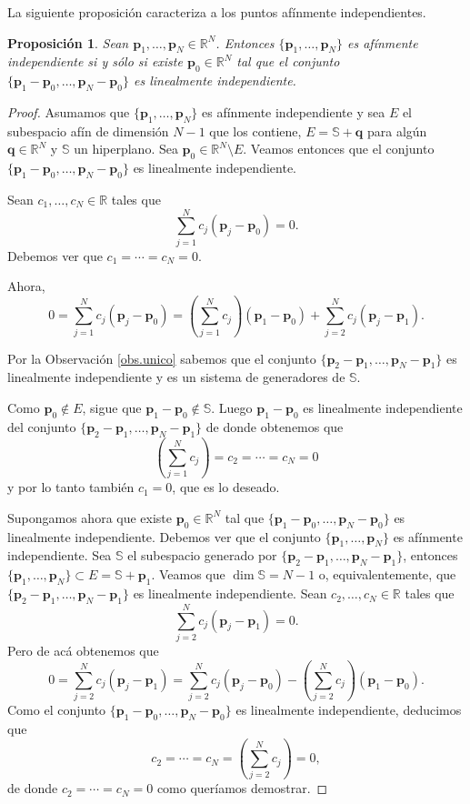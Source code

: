 \documentclass[12pt, a4paper]{amsbook}
\newcommand{\R}{{\mathbb R}}
\newcommand{\Sb}{{\mathbb S}}
\newcommand{\pp}{{\mathbf p}}
\newcommand{\qq}{{\mathbf q}}
\newtheorem{prop}[teo]{Proposici\'on}
\theoremstyle{remark}
\theoremstyle{definition}
\numberwithin{section}{chapter}
\numberwithin{subsection}{section}
\numberwithin{equation}{section}
\numberwithin{figure}{chapter}
\begin{document}
La siguiente proposición caracteriza a los puntos afínmente independientes.
\begin{prop}\label{equiv.afin}
Sean $\pp_1,\dots,\pp_N\in \R^N$. Entonces $\{\pp_1,\dots,\pp_N\}$ es afínmente independiente si y sólo si existe $\pp_0\in\R^N$ tal que el conjunto $\{\pp_1-\pp_0,\dots,\pp_N-\pp_0\}$ es linealmente independiente.
\end{prop}
 
 \begin{proof}
 Asumamos que $\{\pp_1,\dots,\pp_N\}$ es afínmente independiente y sea $E$ el subespacio afín de dimensión $N-1$ que los contiene, $E=\Sb + \qq$ para algún $\qq\in\R^N$ y $\Sb$ un hiperplano. Sea $\pp_0\in \R^N\setminus E$. Veamos entonces que el conjunto $\{\pp_1-\pp_0,\dots,\pp_N-\pp_0\}$ es linealmente independiente. 

Sean $c_1,\dots, c_N\in \R$ tales que
$$
\sum_{j=1}^N c_j (\pp_j-\pp_0) = 0.
$$
Debemos ver que $c_1=\cdots=c_N=0$.

Ahora,
$$
0 = \sum_{j=1}^N c_j (\pp_j-\pp_0) = \left(\sum_{j=1}^N c_j\right) (\pp_1-\pp_0) + \sum_{j=2}^N c_j (\pp_j - \pp_1).
$$ 
 
Por la Observación \ref{obs.unico} sabemos que el conjunto $\{\pp_2-\pp_1,\dots,\pp_N-\pp_1\}$ es linealmente independiente y es un sistema de generadores de $\Sb$. 

Como $\pp_0\not\in E$, sigue que $\pp_1 -\pp_0\not\in \Sb$. Luego $\pp_1-\pp_0$ es linealmente independiente del conjunto $\{\pp_2-\pp_1,\dots,\pp_N-\pp_1\}$ de donde obtenemos que 
$$
\left(\sum_{j=1}^N c_j\right) = c_2 = \cdots = c_N = 0
$$
y por lo tanto también $c_1=0$, que es lo deseado.

Supongamos ahora que existe $\pp_0\in\R^N$ tal que $\{\pp_1-\pp_0,\dots,\pp_N-\pp_0\}$ es linealmente independiente. Debemos ver que el conjunto $\{\pp_1,\dots,\pp_N\}$ es afínmente independiente. Sea $\Sb$ el subespacio generado por $\{\pp_2-\pp_1,\dots,\pp_N-\pp_1\}$, entonces $\{\pp_1,\dots,\pp_N\}\subset E = \Sb + \pp_1$. Veamos que $\dim\Sb=N-1$ o, equivalentemente, que $\{\pp_2-\pp_1,\dots,\pp_N-\pp_1\}$ es linealmente independiente. Sean $c_2,\dots,c_N\in\R$ tales que
$$
\sum_{j=2}^N c_j (\pp_j-\pp_1) = 0.
$$
Pero de acá obtenemos que
$$
0 = \sum_{j=2}^N c_j (\pp_j-\pp_1) = \sum_{j=2}^N c_j (\pp_j-\pp_0) -  \left(\sum_{j=2}^N c_j\right) (\pp_1-\pp_0).
$$
Como el conjunto $\{\pp_1-\pp_0,\dots,\pp_N-\pp_0\}$ es linealmente independiente, deducimos que
$$
c_2 = \cdots = c_N = \left(\sum_{j=2}^N c_j\right) = 0,
$$
de donde $c_2 = \cdots = c_N = 0$ como queríamos demostrar.
\end{proof}
\end{document}
